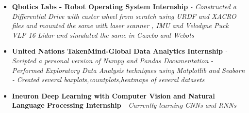 \documentclass{article}
\begin{document}
    \begin{itemize}
        \item{\textbf{\large{Qbotics Labs - Robot Operating System Internship}}}
        \newline
        \textit{- Constructed a Differential Drive with caster wheel from scratch using URDF and XACRO files and mounted the same with laser scanner , IMU and Velodyne Puck VLP-16 Lidar and simulated the same in Gazebo and Webots}
    \end{itemize}
    \begin{itemize}
        \item{\textbf{\large{United Nations TakenMind-Global Data Analytics Internship}}}
        \newline
        \textit{- Scripted a personal version of Numpy and Pandas Documentation }
        \newline
        \textit{- Performed Exploratory Data Analysis techniques using Matplotlib and Seaborn }
        \newline
        \textit{- Created several boxplots,countplots,heatmaps of several datasets}
    \end{itemize}
    \begin{itemize}
        \item{\textbf{\large{Ineuron Deep Learning with Computer Vision and Natural Language Processing Internship}}}
        \newline
        \textit{- Currently learning CNNs and RNNs }
    \end{itemize}
\end{document}
